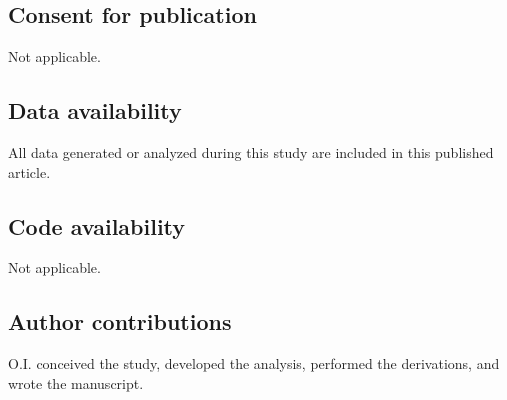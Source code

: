 \documentclass[pdflatex,sn-mathphys-num]{sn-jnl}
\theoremstyle{thmstylethree}
\theoremstyle{thmstyleone}
\theoremstyle{thmstyletwo}
\numberwithin{equation}{section}
\begin{document}
    \subsection*{Consent for publication}
        Not applicable.
    
    \subsection*{Data availability}
        All data generated or analyzed during this study are included in this published article.
    
    \subsection*{Code availability}
        Not applicable.
    
    \subsection*{Author contributions}
        O.I. conceived the study, developed the analysis, performed the derivations, and wrote the manuscript.
\end{document}

